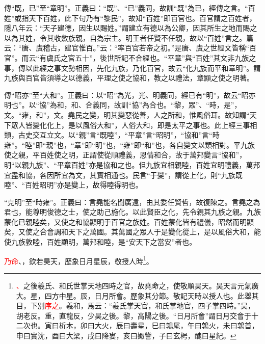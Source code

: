 {\noindent\zhuan{}\fzbyks 傳“既，已”至“章明”。正義曰：“既”、“已”義同，故訓“既”為已，經傳之言。“百姓”或指天下百姓，此下句乃有“黎民”，故知“百姓”即百官也。百官謂之百姓者，隱八年云：“天子建德，因生以賜姓。”謂建立有德以為公卿，因其所生之地而賜之以為其姓，令其收斂族親，自為宗主。明王者任賢不任親，故以“百姓”言之。篇云：“唐、虞稽古，建官惟百。”云：“率百官若帝之初。”是唐、虞之世經文皆稱“百官”。而云“有虞氏之官五十”，後世所記不合經也。“平章”與“百姓”其文非九族之事，傳以此經之事文勢相因，先化九族，乃化百官，故云“化九族而平和章明”。謂九族與百官皆須導之以德義，平理之使之協和，教之以禮法，章顯之使之明著。 \par}

{\noindent\zhuan{}\fzbyks 傳“昭亦”至“大和”。正義曰：以“昭”為光，光、明義同，經已有“明”，故云“昭亦明也”。以“協”為和，和、合義同，故訓“協”為合也。“黎，眾”、“時，是”，文。“雍，和”，文。堯民之變，明其變惡從善，人之所和，惟風俗耳。故知謂“天下眾人皆變化化上，是以風俗大和”，人俗大和，即是太平之事也。此上經三事相類，古史交互立文。以“親”言“既睦”，“平章”言“昭明”，“協和”言“時雍”。“睦”即“親”也，“章”即“明”也，“雍”即“和”也，各自變文以類相對。平九族使之親，平百姓使之明，正謂使從順禮義，恩情和合，故于萬邦變言“協和”，明“以親九族”、“平章百姓”亦是協和之也。但九族宜相親睦，百姓宜明禮義，萬邦宜盡和協，各因所宜為文，其實相通也。民言“于變”，謂從上化，則“九族既睦”、“百姓昭明”亦是變上，故得睦得明也。 \par}

{\noindent\shu{}\fzkt “克明”至“時雍”。正義曰：言堯能名聞廣遠，由其委任賢哲，故復陳之。言堯之為君也，能尊明俊德之士，使之助己施化。以此賢臣之化，先令親其九族之親。九族蒙化已親睦矣，又使之和協顯明于百官之族姓。百姓蒙化皆有禮儀，昭然而明顯矣，又使之合會調和天下之萬國。其萬國之眾人于是變化從上，是以風俗大和，能使九族敦睦，百姓顯明，萬邦和睦，是“安天下之當安”者也。 \par}

\textcolor{red}{乃命}、，欽若昊天，歷象日月星辰，敬授人時\footnote{\textcolor{red}{、}之後羲氏、和氏世掌天地四時之官，故堯命之，使敬順昊天。昊天言元氣廣大。星，四方中星。辰，日月所會。歷象其分節。敬記天時以授人也。此舉其目，下別\textcolor{red}{序之}。羲和，馬云：“羲氏掌天官，和氏掌地官，四子掌四時。”昊，胡老反。重，直龍反，少昊之後。黎，高陽之後。“日月所會”謂日月交會于十二次也。寅曰析木，卯曰大火，辰曰壽星，巳曰鶉尾，午曰鶉火，未曰鶉首，申曰實沈，酉曰大梁，戌曰降婁，亥曰娵訾，子曰玄枵，醜曰星紀。}。

